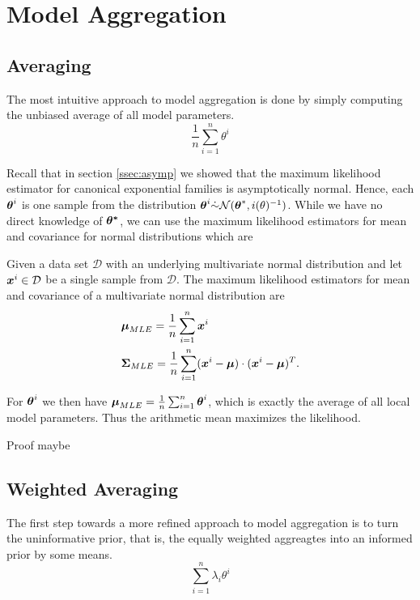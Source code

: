 
\chapter{Model Aggregation}
\label{chapter:ch3}

\section{Averaging}
The most intuitive approach to model aggregation is done by simply computing the unbiased average of all model parameters.
\begin{equation}
    \frac{1}{n} \sum_{i=1}^n \theta^i
\end{equation}

Recall that in section \ref{ssec:asymp} we showed that the maximum likelihood estimator for canonical exponential families is asymptotically normal.
Hence, each $\boldsymbol{\theta}^i$ is one sample from the distribution $\boldsymbol{\theta}^i \dot{\sim} \mathcal{N}(\boldsymbol{\theta}^*, i(\theta)^{-1})$.
While we have no direct knowledge of $\boldsymbol{\theta^*}$, we can use the maximum likelihood estimators for mean and covariance for normal distributions which are

\begin{tcolorbox}
    Given a data set $\mathcal{D}$ with an underlying multivariate normal distribution and let $\boldsymbol{x}^i \in \mathcal{D}$ be a single sample from $\mathcal{D}$.
    The maximum likelihood estimators for mean and covariance of a multivariate normal distribution are
    \begin{equation}
        \begin{split}
            &\boldsymbol{\mu}_{MLE} = \frac{1}{n} \sum_{i=1}^n \boldsymbol{x}^i \\
        &\boldsymbol{\Sigma}_{MLE} = \frac{1}{n} \sum_{i=1}^n (\boldsymbol{x}^i - \boldsymbol{\mu}) \cdot  (\boldsymbol{x}^i - \boldsymbol{\mu})^T.
        \end{split}
    \end{equation}
\end{tcolorbox}

For $\boldsymbol{\theta}^i$ we then have $\boldsymbol{\mu}_{MLE} = \frac{1}{n} \sum_{i=1}^n \boldsymbol{\theta}^i$, which is exactly the average of all local model parameters.
Thus the arithmetic mean maximizes the likelihood.
\begin{tcolorbox}
    Proof maybe 
\end{tcolorbox}


\section{Weighted Averaging}
The first step towards a more refined approach to model aggregation is to turn the uninformative prior, that is, the equally weighted aggreagtes into an informed prior by some means.
\begin{equation}
     \sum_{i=1}^n \lambda_i \theta^i
\end{equation}

